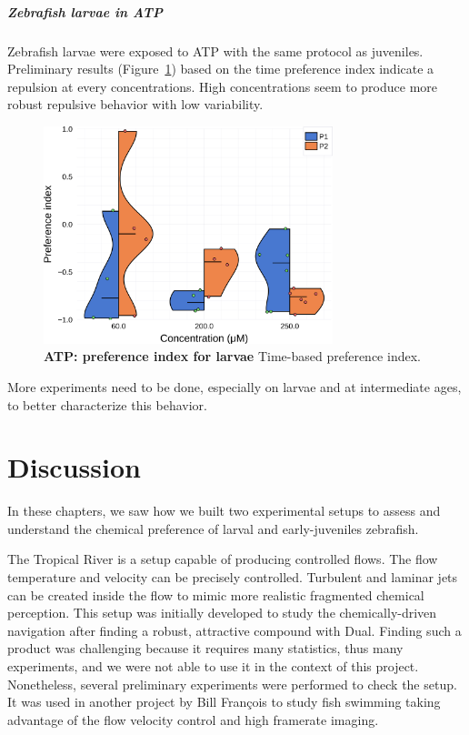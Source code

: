     \paragraph{Zebrafish larvae in ATP} Zebrafish larvae were exposed to ATP with the same protocol as juveniles. Preliminary results (Figure~\ref{dist_atp_lar}) based on the time preference index indicate a repulsion at every concentrations. High concentrations seem to produce more robust repulsive behavior with low variability.

    \begin{figure}[h!]
      \centering
      \includegraphics[width=0.75\textwidth]{part_2/assets/dist_atp_lar.png}
      \caption{\textbf{ATP: preference index for larvae} Time-based preference index. }
      \label{dist_atp_lar}
    \end{figure}

  More experiments need to be done, especially on larvae and at intermediate ages, to better characterize this behavior.

  \chapter{Discussion}
  \label{discussion}
  In these chapters, we saw how we built two experimental setups to assess and understand the chemical preference of larval and early-juveniles zebrafish.

  The Tropical River is a setup capable of producing controlled flows. The flow temperature and velocity can be precisely controlled. Turbulent and laminar jets can be created inside the flow to mimic more realistic fragmented chemical perception. This setup was initially developed to study the chemically-driven navigation after finding a robust, attractive compound with Dual. Finding such a product was challenging because it requires many statistics, thus many experiments, and we were not able to use it in the context of this project. Nonetheless, several preliminary experiments were performed to check the setup. It was used in another project by Bill François to study fish swimming taking advantage of the flow velocity control and high framerate imaging.

